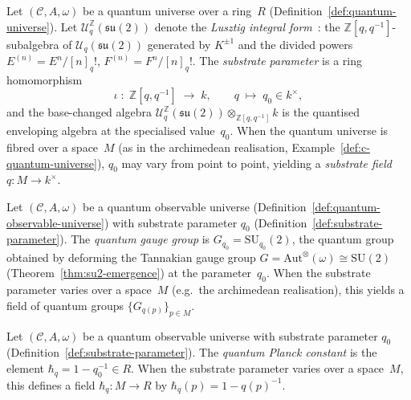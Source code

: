 \begin{definition}
\label{def:substrate-parameter}
\leanok
Let $(\mathcal{C}, A, \omega)$ be a quantum universe over a ring~$R$
(Definition~\ref{def:quantum-universe}).  Let
$\mathcal{U}^{\mathbb{Z}}_q(\mathfrak{su}(2))$ denote the
\emph{Lusztig integral form}~\cite{lusztig1993}: the
$\mathbb{Z}[q,q^{-1}]$-subalgebra of $\mathcal{U}_q(\mathfrak{su}(2))$
generated by $K^{\pm 1}$ and the divided powers
$E^{(n)} = E^n/[n]_q!$, $F^{(n)} = F^n/[n]_q!$.
The \emph{substrate parameter} is a ring homomorphism
\[
  \iota \;\colon\; \mathbb{Z}[q, q^{-1}] \;\longrightarrow\; k,
  \qquad q \;\longmapsto\; q_0 \in k^{\times},
\]
and the base-changed algebra
$\mathcal{U}^{\mathbb{Z}}_q(\mathfrak{su}(2))
  \otimes_{\mathbb{Z}[q,q^{-1}]} k$
is the quantised enveloping algebra at the specialised value~$q_0$.
When the quantum universe is fibred over a space~$M$ (as in the
archimedean realisation, Example~\ref{def:c-quantum-universe}), $q_0$
may vary from point to point, yielding a \emph{substrate field}
$q \colon M \to k^{\times}$.
\end{definition}

\begin{definition}
\label{def:quantum-gauge-group}
\leanok
Let $(\mathcal{C}, A, \omega)$ be a quantum observable universe
(Definition~\ref{def:quantum-observable-universe}) with substrate
parameter $q_0$ (Definition~\ref{def:substrate-parameter}).  The
\emph{quantum gauge group} is
$G_{q_0} = \mathrm{SU}_{q_0}(2)$, the quantum group obtained by
deforming the Tannakian gauge group
$G = \mathrm{Aut}^{\otimes}(\omega) \cong \mathrm{SU}(2)$
(Theorem~\ref{thm:su2-emergence}) at the parameter~$q_0$.  When the
substrate parameter varies over a space~$M$ (e.g.\ the archimedean
realisation), this yields a field of quantum groups
$\{G_{q(p)}\}_{p \in M}$.
\end{definition}

\begin{definition}
\label{def:quantum-planck-constant}
\leanok
Let $(\mathcal{C}, A, \omega)$ be a quantum observable universe with
substrate parameter $q_0$
(Definition~\ref{def:substrate-parameter}).  The
\emph{quantum Planck constant} is the element
$\hbar_q = 1 - q_0^{-1} \in R$.  When the substrate parameter varies
over a space~$M$, this defines a field
$\hbar_q \colon M \to R$ by $\hbar_q(p) = 1 - q(p)^{-1}$.
\end{definition}

